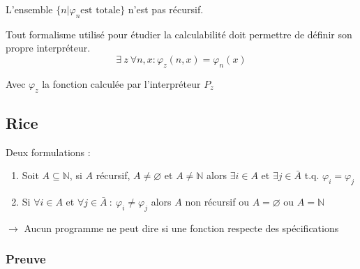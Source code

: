 L'ensemble $\{n | \varphi_n \text{est totale} \}$ n'est pas récursif.
\begin{formal}
Tout formalisme utilisé pour étudier la calculabilité doit permettre de définir son propre interpréteur.
\begin{equation*}
\exists \ z \ \forall n, x : \varphi_z(n, x) = \varphi_n (x)
\end{equation*}
\begin{flushright}
Avec $\varphi_z$ la fonction calculée par l'interpréteur $P_z$
\end{flushright}
\end{formal}

\subsection{Rice}

Deux formulations :
\begin{enumerate}
\item Soit $A \subseteq \mathbb{N}$, si $A$ récursif, $A \neq \varnothing$ et $A \neq \mathbb{N}$ alors $\exists i \in A$ et $\exists j \in \bar{A}$ t.q. $\varphi_i = \varphi_j$
\item Si $\forall i \in A$ et $\forall j \in \bar{A} \ : \ \varphi_i \neq \varphi_j$ alors $A$ non récursif ou $A = \varnothing$ ou $A = \mathbb{N}$
\end{enumerate}
$\rightarrow$ Aucun programme ne peut dire si une fonction respecte des spécifications


\subsubsection{Preuve}

